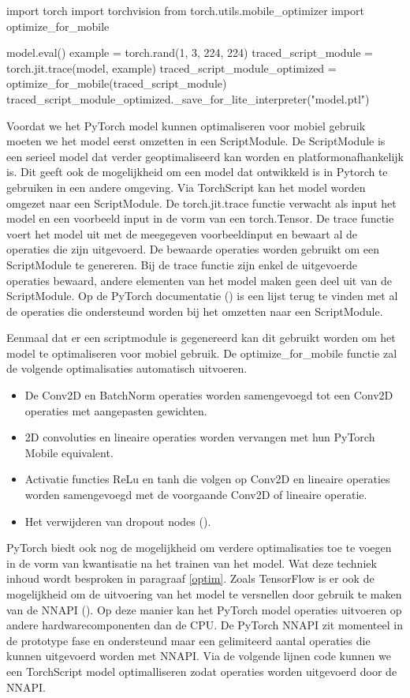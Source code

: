 \begin{python}
import torch
import torchvision
from torch.utils.mobile_optimizer import optimize_for_mobile
	
model.eval()
example = torch.rand(1, 3, 224, 224)
traced_script_module = torch.jit.trace(model, example)
traced_script_module_optimized = optimize_for_mobile(traced_script_module)
traced_script_module_optimized._save_for_lite_interpreter("model.ptl")
\end{python}

Voordat we het PyTorch model kunnen optimaliseren voor mobiel gebruik moeten we het model eerst omzetten in een ScriptModule.
De ScriptModule is een serieel model dat verder geoptimaliseerd kan worden en platformonafhankelijk is.
Dit geeft ook de mogelijkheid om een model dat ontwikkeld is in Pytorch te gebruiken in een andere omgeving.
Via TorchScript kan het model worden omgezet naar een ScriptModule.
De torch.jit.trace functie verwacht als input het model en een voorbeeld input in de vorm van een torch.Tensor.
De trace functie voert het model uit met de meegegeven voorbeeldinput en bewaart al de operaties die zijn uitgevoerd.
De bewaarde operaties worden gebruikt om een ScriptModule te genereren.
Bij de trace functie zijn enkel de uitgevoerde operaties bewaard, andere elementen van het model maken geen deel uit van de ScriptModule.
Op de PyTorch documentatie (\cite{Facebook_PyTorch_2017}) is een lijst terug te vinden met al de operaties die ondersteund worden bij het omzetten naar een ScriptModule.

Eenmaal dat er een scriptmodule is gegenereerd kan dit gebruikt worden om het model te optimaliseren voor mobiel gebruik.
De optimize\_for\_mobile functie zal de volgende optimalisaties automatisch uitvoeren.

\begin{itemize}
	\item De Conv2D en BatchNorm operaties worden samengevoegd tot een Conv2D operaties met aangepasten gewichten.
	\item 2D convoluties en lineaire operaties worden vervangen met hun PyTorch Mobile equivalent.
	\item Activatie functies ReLu en tanh die volgen op Conv2D en lineaire operaties worden samengevoegd met de voorgaande Conv2D of lineaire operatie.
	\item Het verwijderen van dropout nodes (\cite{Facebook_PyTorch_2017}).
\end{itemize}

PyTorch biedt ook nog de mogelijkheid om verdere optimalisaties toe te voegen in de vorm van kwantisatie na het trainen van het model.
Wat deze techniek inhoud wordt besproken in paragraaf \ref{optim}.
Zoals TensorFlow is er ook de mogelijkheid om de uitvoering van het model te versnellen door gebruik te maken van de NNAPI (\cite{Android_NNAPI_2021}).
Op deze manier kan het PyTorch model operaties uitvoeren op andere hardwarecomponenten dan de CPU.
De PyTorch NNAPI zit momenteel in de prototype fase en ondersteund maar een gelimiteerd aantal operaties die kunnen uitgevoerd worden met NNAPI.
Via de volgende lijnen code kunnen we een TorchScript model optimalliseren zodat operaties worden uitgevoerd door de NNAPI.

